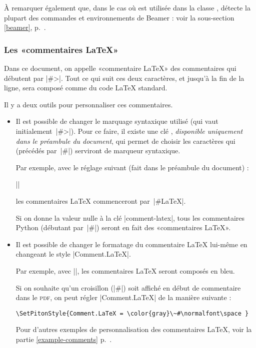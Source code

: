 \documentclass[dvipsnames,svgnames]{article}
\begin{document}
\smallskip
À remarquer également que, dans le cas où  est utilisée dans la classe ,  détecte
la plupart des commandes et environnements de Beamer : voir la sous-section \ref{beamer}, p.~\pageref{beamer}.


\subsubsection{Les «commentaires LaTeX»}


Dans ce document, on appelle «commentaire LaTeX» des commentaires qui débutent par |#>|. Tout ce qui suit ces deux 
caractères, et jusqu'à la fin de la ligne, sera composé comme du code LaTeX standard.

Il y a deux outils pour personnaliser ces commentaires.

\begin{itemize}
\item Il est possible de changer le marquage syntaxique utilisé (qui vaut initialement~|#>|). Pour ce faire, il
existe une clé , \emph{disponible uniquement dans le préambule du document}, qui permet de choisir les
caractères qui (précédés par~|#|) serviront de marqueur syntaxique.

Par exemple, avec le réglage suivant (fait dans le préambule du document) :

||

les commentaires LaTeX commenceront par~|#LaTeX|.

Si on donne la valeur nulle à la clé |comment-latex|, tous les commentaires Python (débutant par~|#|) seront en
fait des «commentaires LaTeX».

\smallskip
\item Il est possible de changer le formatage du commentaire LaTeX lui-même en changeant le style 
|Comment.LaTeX|.

Par exemple, avec ||, les commentaires LaTeX seront composés
en bleu.

Si on souhaite qu'un croisillon (|#|) soit affiché en début de commentaire dans le \textsc{pdf}, on peut régler
|Comment.LaTeX| de la manière suivante :

\begin{Verbatim}
\SetPitonStyle{Comment.LaTeX = \color{gray}\~#\normalfont\space }
\end{Verbatim}

Pour d'autres exemples de personnalisation des commentaires LaTeX, voir la partie \ref{example-comments}
p.~\pageref{example-comments}. 
\end{itemize}
\end{document}
